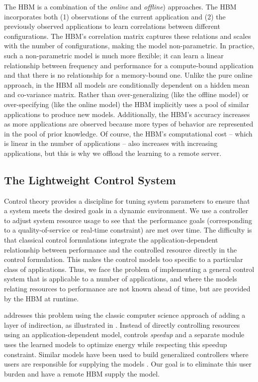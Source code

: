 The HBM is a combination of the \emph{online} and \emph{offline})
approaches. The HBM incorporates both (1) observations of the current
application and (2) the previously observed applications to learn
correlations between different configurations.  The HBM's correlation
matrix captures these relations and scales with the number of
configurations, making the model non-parametric.  In practice, such a
non-parametric model is much more flexible; \eg{} it can learn a
linear relationship between frequency and performance for a
compute-bound application and that there is no relationship for a
memory-bound one.  Unlike the pure online approach, in the HBM all
models are conditionally dependent on a hidden mean and co-variance
matrix.  Rather than over-generalizing (like the offline model) or
over-specifying (like the online model) the HBM implicitly uses a pool
of similar applications to produce new models. Additionally, the HBM's
accuracy increases as more applications are observed because more
types of behavior are represented in the pool of prior knowledge.  Of
course, the HBM's computational cost -- which is linear in the number
of applications -- also increases with increasing applications, but
this is why we offload the learning to a remote server.

\subsection{The Lightweight Control System}

Control theory provides a discipline for tuning system parameters to
ensure that a system meets the desired goals in a dynamic environment.
We use a controller to adjust system resource usage to see that the
performance goals (corresponding to a quality-of-service or real-time
constraint) are met over time.  The difficulty is that classical
control formulations integrate the application-dependent relationship
between performance and the controlled resource directly in the
control formulation. This makes the control models too specific to a
particular class of applications.  Thus, we face the problem of
implementing a general control system that is applicable to a number
of applications, and where the models relating resources to
performance are not known ahead of time, but are provided by the HBM
at runtime.

\SYSTEM{} addresses this problem using the classic computer science
approach of adding a layer of indirection, as illustrated in
.  Instead of directly controlling resources
using an application-dependent model, \SYSTEM{} controls
\emph{speedup} and a separate module uses the learned models to
optimize energy while respecting this speedup constraint.  Similar
models have been used to build generalized controllers where users are
responsible for supplying the models \cite{ControlWare,POET}.  Our
goal is to eliminate this user burden and have a remote HBM supply the
model.

